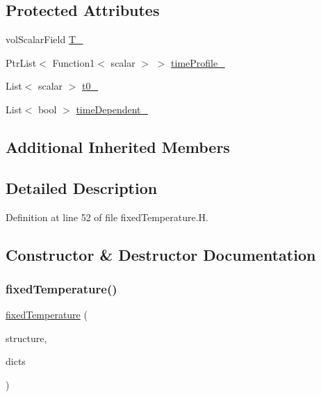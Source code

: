\subsection*{Protected Attributes}
\begin{DoxyCompactItemize}
\item 
vol\+Scalar\+Field \hyperlink{classFoam_1_1powerModels_1_1fixedTemperature_a97c6919892227364774ffd51f3fa625b}{T\+\_\+}
\item 
Ptr\+List$<$ Function1$<$ scalar $>$ $>$ \hyperlink{classFoam_1_1powerModels_1_1fixedTemperature_af04ec83129f2dbb32ddd3e46e6e6a778}{time\+Profile\+\_\+}
\item 
List$<$ scalar $>$ \hyperlink{classFoam_1_1powerModels_1_1fixedTemperature_a15480c8346d9202ae61b7a3d920ecfa7}{t0\+\_\+}
\item 
List$<$ bool $>$ \hyperlink{classFoam_1_1powerModels_1_1fixedTemperature_aa7de418f5709d721311e6d40486f54b2}{time\+Dependent\+\_\+}
\end{DoxyCompactItemize}
\subsection*{Additional Inherited Members}


\subsection{Detailed Description}


Definition at line 52 of file fixed\+Temperature.\+H.



\subsection{Constructor \& Destructor Documentation}
\mbox{\label{classFoam_1_1powerModels_1_1fixedTemperature_a2b54096181326868569b551d6c9e2c74}} 
\subsubsection{\texorpdfstring{fixed\+Temperature()}{fixedTemperature()}}
{\footnotesize\ttfamily \hyperlink{classFoam_1_1powerModels_1_1fixedTemperature}{fixed\+Temperature} (\begin{DoxyParamCaption}\item[{\hyperlink{classFoam_1_1structure}{structure} \&}]{structure,  }\item[{const dictionary \&}]{dicts }\end{DoxyParamCaption})}



